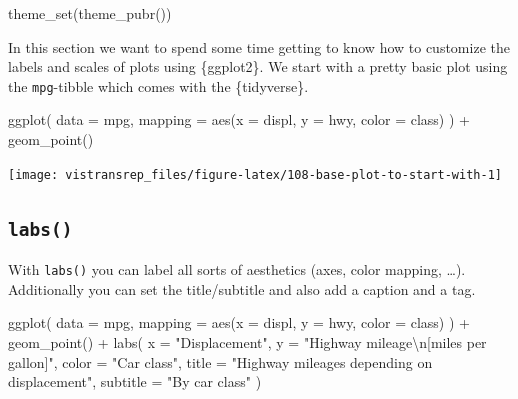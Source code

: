\documentclass[]{book}
\newenvironment{Shaded}{}{}
\newcommand{\CharTok}[1]{\textcolor[rgb]{0.00,0.50,0.50}{#1}}
\newcommand{\DataTypeTok}[1]{#1}
\newcommand{\KeywordTok}[1]{\textcolor[rgb]{0.00,0.00,1.00}{#1}}
\newcommand{\NormalTok}[1]{#1}
\newcommand{\OperatorTok}[1]{#1}
\newcommand{\StringTok}[1]{\textcolor[rgb]{0.00,0.50,0.50}{#1}}
\begin{document}
\begin{Shaded}
\begin{Highlighting}[]
\KeywordTok{theme_set}\NormalTok{(}\KeywordTok{theme_pubr}\NormalTok{())}
\end{Highlighting}
\end{Shaded}

In this section we want to spend some time getting to know how to customize the labels and scales of plots using \{ggplot2\}.
We start with a pretty basic plot using the \texttt{mpg}-tibble which comes with the \{tidyverse\}.

\begin{Shaded}
\begin{Highlighting}[]
\KeywordTok{ggplot}\NormalTok{(}
  \DataTypeTok{data =}\NormalTok{ mpg,}
  \DataTypeTok{mapping =} \KeywordTok{aes}\NormalTok{(}\DataTypeTok{x =}\NormalTok{ displ, }\DataTypeTok{y =}\NormalTok{ hwy, }\DataTypeTok{color =}\NormalTok{ class)}
\NormalTok{) }\OperatorTok{+}
\StringTok{  }\KeywordTok{geom_point}\NormalTok{()}
\end{Highlighting}
\end{Shaded}

\begin{flushright}\texttt{[image: vistransrep\_files/figure-latex/108-base-plot-to-start-with-1]} \end{flushright}

\hypertarget{labs}{%
\subsection{\texorpdfstring{\texttt{labs()}}{labs()}}\label{labs}}

With \texttt{labs()} you can label all sorts of aesthetics (axes, color mapping, \ldots{}).
Additionally you can set the title/subtitle and also add a caption and a tag.

\begin{Shaded}
\begin{Highlighting}[]
\KeywordTok{ggplot}\NormalTok{(}
  \DataTypeTok{data =}\NormalTok{ mpg,}
  \DataTypeTok{mapping =} \KeywordTok{aes}\NormalTok{(}\DataTypeTok{x =}\NormalTok{ displ, }\DataTypeTok{y =}\NormalTok{ hwy, }\DataTypeTok{color =}\NormalTok{ class)}
\NormalTok{) }\OperatorTok{+}
\StringTok{  }\KeywordTok{geom_point}\NormalTok{() }\OperatorTok{+}
\StringTok{  }\KeywordTok{labs}\NormalTok{(}
    \DataTypeTok{x =} \StringTok{"Displacement"}\NormalTok{,}
    \DataTypeTok{y =} \StringTok{"Highway mileage}\CharTok{\textbackslash{}n}\StringTok{[miles per gallon]"}\NormalTok{,}
    \DataTypeTok{color =} \StringTok{"Car class"}\NormalTok{,}
    \DataTypeTok{title =} \StringTok{"Highway mileages depending on displacement"}\NormalTok{,}
    \DataTypeTok{subtitle =} \StringTok{"By car class"}
\NormalTok{  )}
\end{Highlighting}
\end{Shaded}
\end{document}
